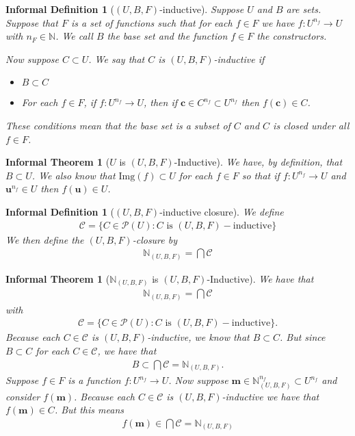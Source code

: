 \documentclass[12pt]{article}
\theoremstyle{break}
\theoremstyle{break}
\theoremstyle{break}
\theoremstyle{break}
\theoremstyle{break}
\newtheorem{informal definition}[definition]{Informal Definition}
\theoremstyle{break}
\newtheorem{informal theorem}[theorem]{Informal Theorem}
\newcommand{\bv}[1]{\boldsymbol{#1}}
\newcommand{\mc}[1]{\mathcal{#1}}
\newcommand{\natnum}[0]{\mathbb{N}}
\begin{document}
	\begin{informal definition}[$(U, B, F)$-inductive]
		Suppose $U$ and $B$ are sets. Suppose that $F$ is a set of functions such that for each $f\in F$ we have $f: U^{n_f} \to U$ with $n_F \in \natnum$.
		We call $B$ the base set and the function $f\in F$ the constructors.
		
		Now suppose $C\subset U$. 
		We say that $C$ is $(U, B, F)$-inductive if 
		\begin{itemize}
			\item{$B\subset C$}
			\item{For each $f\in F$, if $f:U^{n_f} \to U$, then if $\bv{c}\in C^{n_f}\subset U^{n_f}$ then $f(\bv{c}) \in C$.}
		\end{itemize}
		These conditions mean that the base set is a subset of $C$ and $C$ is closed under all $f\in F$.
	\end{informal definition}
	
	\begin{informal theorem}[$U$ is $(U, B, F)$-Inductive]
		We have, by definition, that $B\subset U$.
		We also know that $\text{Img}(f) \subset U$ for each $f\in F$ so that if $f:U^{n_f}\to U$ and $\bv{u}^{n_f}\in U$ then $f(\bv{u})\in U$.
	\end{informal theorem}
	
	\begin{informal definition}[$(U, B, F)$-inductive closure]
		We define
		\begin{align*}
			\mc{C} = \{C\in \mc{P}(U): C \text{ is } (U, B, F)-\text{inductive}\}
		\end{align*}
		We then define the $(U, B, F)$-closure by
		\begin{align*}
			\natnum_{(U, B, F)} = \bigcap \mc{C}
		\end{align*}
	\end{informal definition}
	
	\begin{informal theorem}[$\natnum_{(U, B, F)}$ is $(U, B, F)$-Inductive]
		We have that 
		\begin{align*}
			\natnum_{(U, B, F)} = \bigcap \mc{C}
		\end{align*}
		with 
		\begin{align*}
			\mc{C} = \{C\in \mc{P}(U): C \text{ is } (U, B, F)-\text{inductive}\}.
		\end{align*}
		Because each $C \in \mc{C}$ is $(U, B, F)$-inductive, we know that $B\subset C$. 
		But since $B\subset C$ for each $C\in \mc{C}$, we have that
		\begin{align*}
			B \subset \bigcap \mc{C} = \natnum_{(U, B, F)}.
		\end{align*}
		Suppose $f\in F$ is a function $f:U^{n_f}\to U$. 
		Now suppose $\bv{m} \in \natnum_{(U, B, F)}^{n_f}\subset U^{n_f}$ and consider $f(\bv{m})$.
		Because each $C\in \mc{C}$ is $(U, B, F)$-inductive we have that $f(\bv{m}) \in C$.
		But this means 
		\begin{align*}
			f(\bv{m}) \in \bigcap \mc{C} = \natnum_{(U, B, F)}
		\end{align*}		
	\end{informal theorem}
	
\end{document}
